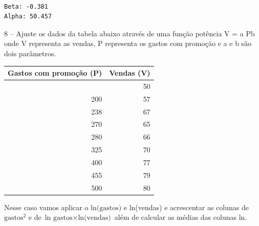 \documentclass[11pt]{article}
\begin{document}
    
    \begin{center}
    \end{center}
    { \hspace*{\fill} \\}
    
    \begin{Verbatim}[commandchars=\\\{\}]
Beta: -0.381
Alpha: 50.457
    \end{Verbatim}

    8 -- Ajuste os dados da tabela abaixo através de uma função potência V =
a Pb onde V representa as vendas, P representa os gastos com promoção e
a e b são dois parâmetros.

{\def\LTcaptype{none} %
\begin{longtable}[]{@{}rr@{}}
\toprule\noalign{}
Gastos com promoção (P) & Vendas (V) \\
\midrule\noalign{}
\endhead
\bottomrule\noalign{}
\endlastfoot
140 & 50 \\
200 & 57 \\
238 & 67 \\
270 & 65 \\
280 & 66 \\
325 & 70 \\
400 & 77 \\
455 & 79 \\
500 & 80 \\
\end{longtable}
}

Nesse caso vamos aplicar o \(\text{ln(gastos)}\) e ln(vendas) e
acrescentar as colunas de \(\text{gastos}^2\) e de
\(\text{ln gastos}\times\text{ln(vendas)}\) além de calcular as médias
das colunas ln.
\end{document}
